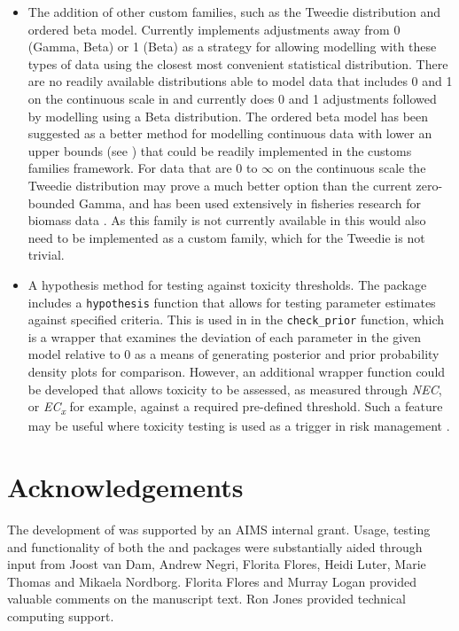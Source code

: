 \begin{itemize}
\item
  The addition of other custom families, such as the Tweedie
  distribution and ordered beta model. Currently 
  implements adjustments away from 0 (Gamma, Beta) or 1 (Beta) as a
  strategy for allowing modelling with these types of data using the
  closest most convenient statistical distribution. There are no readily
  available distributions able to model data that includes 0 and 1 on
  the continuous scale in  and  currently does 0
  and 1 adjustments followed by modelling using a Beta distribution. The
  ordered beta model has been suggested as a better method for modelling
  continuous data with lower an upper bounds (see \citep{Kubinec}) that
  could be readily implemented in the  customs families
  framework. For data that are 0 to \(\infty\) on the continuous scale
  the Tweedie distribution may prove a much better option than the
  current zero-bounded Gamma, and has been used extensively in fisheries
  research for biomass data \citep{Shono2008}. As this family is not
  currently available in  this would also need to be
  implemented as a custom family, which for the Tweedie is not trivial.
\item
  A hypothesis method for testing against toxicity thresholds. The
   package includes a \texttt{hypothesis} function that allows
  for testing parameter estimates against specified criteria. This is
  used in  in the \texttt{check\_prior} function, which is
  a wrapper that examines the deviation of each parameter in the given
  model relative to 0 as a means of generating posterior and prior
  probability density plots for comparison. However, an additional
  wrapper function could be developed that allows toxicity to be
  assessed, as measured through \emph{NEC}, or
  \emph{EC\textsubscript{x}} for example, against a required pre-defined
  threshold. Such a feature may be useful where toxicity testing is used
  as a trigger in risk management \citep[for example, using
  whole-effluent-toxicity (WET) testing,][]{Karman2019}.
\end{itemize}

\hypertarget{acknowledgements}{%
\section{Acknowledgements}\label{acknowledgements}}

The development of  was supported by an AIMS internal
grant. Usage, testing and functionality of both the  and
 packages were substantially aided through input from
Joost van Dam, Andrew Negri, Florita Flores, Heidi Luter, Marie Thomas
and Mikaela Nordborg. Florita Flores and Murray Logan provided valuable
comments on the manuscript text. Ron Jones provided technical computing
support.

